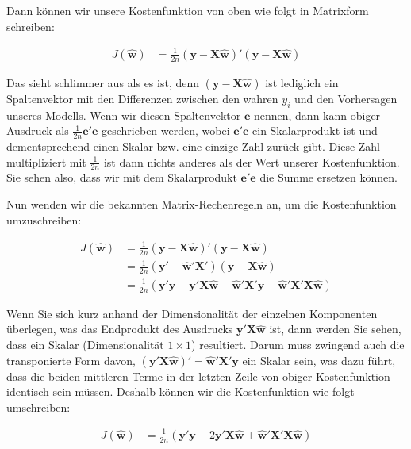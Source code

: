 \documentclass[
]{book}
\begin{document}
Dann können wir unsere Kostenfunktion von oben wie folgt in Matrixform schreiben:

\begin{align}
J(\mathbf{\hat{w}}) &= \frac{1}{2n} (\mathbf{y} - \mathbf{X}\mathbf{\hat{w}})' (\mathbf{y} - \mathbf{X}\mathbf{\hat{w}})
\end{align}

Das sieht schlimmer aus als es ist, denn \((\mathbf{y} - \mathbf{X}\mathbf{\hat{w}})\) ist lediglich ein Spaltenvektor mit den Differenzen zwischen den wahren \(y_i\) und den Vorhersagen unseres Modells. Wenn wir diesen Spaltenvektor \(\mathbf{e}\) nennen, dann kann obiger Ausdruck als \(\frac{1}{2n} \mathbf{e}'\mathbf{e}\) geschrieben werden, wobei \(\mathbf{e}'\mathbf{e}\) ein Skalarprodukt ist und dementsprechend einen Skalar bzw. eine einzige Zahl zurück gibt. Diese Zahl multipliziert mit \(\frac{1}{2n}\) ist dann nichts anderes als der Wert unserer Kostenfunktion. Sie sehen also, dass wir mit dem Skalarprodukt \(\mathbf{e}'\mathbf{e}\) die Summe ersetzen können.

Nun wenden wir die bekannten Matrix-Rechenregeln an, um die Kostenfunktion umzuschreiben:

\begin{align}
J(\mathbf{\hat{w}}) &= \frac{1}{2n} (\mathbf{y} - \mathbf{X}\mathbf{\hat{w}})' (\mathbf{y} - \mathbf{X}\mathbf{\hat{w}}) \\
&= \frac{1}{2n} (\mathbf{y}' - \mathbf{\hat{w}}' \mathbf{X}') (\mathbf{y} - \mathbf{X}\mathbf{\hat{w}}) \\
&= \frac{1}{2n} (\mathbf{y}'\mathbf{y} - \mathbf{y}'\mathbf{X}\mathbf{\hat{w}} - \mathbf{\hat{w}}' \mathbf{X}'\mathbf{y} + \mathbf{\hat{w}}' \mathbf{X}'\mathbf{X}\mathbf{\hat{w}})
\end{align}

Wenn Sie sich kurz anhand der Dimensionalität der einzelnen Komponenten überlegen, was das Endprodukt des Ausdrucks \(\mathbf{y}'\mathbf{X}\mathbf{\hat{w}}\) ist, dann werden Sie sehen, dass ein Skalar (Dimensionalität \(1 \times 1\)) resultiert. Darum muss zwingend auch die transponierte Form davon, \((\mathbf{y}'\mathbf{X}\mathbf{\hat{w}})'=\mathbf{\hat{w}}' \mathbf{X}'\mathbf{y}\) ein Skalar sein, was dazu führt, dass die beiden mittleren Terme in der letzten Zeile von obiger Kostenfunktion identisch sein müssen. Deshalb können wir die Kostenfunktion wie folgt umschreiben:

\begin{align}
J(\mathbf{\hat{w}}) &= \frac{1}{2n} (\mathbf{y}'\mathbf{y} - 2\mathbf{y}'\mathbf{X}\mathbf{\hat{w}} + \mathbf{\hat{w}}' \mathbf{X}'\mathbf{X}\mathbf{\hat{w}})
\end{align}
\end{document}
